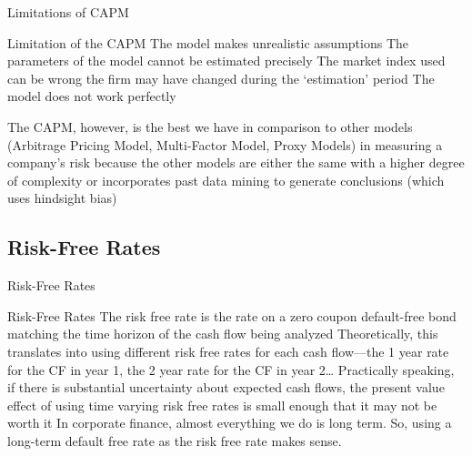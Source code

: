 \documentclass[10pt]{article}
\begin{document}
    \begin{core}{Limitations of CAPM}

      Limitation of the CAPM
      The model makes unrealistic assumptions
      The parameters of the model cannot be estimated precisely
      The market index used can be wrong
      the firm may have changed during the ‘estimation’ period
      The model does not work perfectly

      The CAPM, however, is the best we have in comparison to other models (Arbitrage Pricing Model, Multi-Factor Model, Proxy Models) in measuring a company’s risk because the other models are either the same with a higher degree of complexity or incorporates past data mining to generate conclusions (which uses hindsight bias) 

    \end{core}

  \subsection{Risk-Free Rates}

    \begin{core}{Risk-Free Rates}

      Risk-Free Rates
      The risk free rate is the rate on a zero coupon default-free bond matching the time horizon of the cash flow being analyzed
      Theoretically, this translates into using different risk free rates for each cash flow—the 1 year rate for the CF in year 1, the 2 year rate for the CF in year 2…
      Practically speaking, if there is substantial uncertainty about expected cash flows, the present value effect of using time varying risk free rates is small enough that it may not be worth it
      In corporate finance, almost everything we do is long term. So, using a long-term default free rate as the risk free rate makes sense.

    \end{core}
\end{document}
